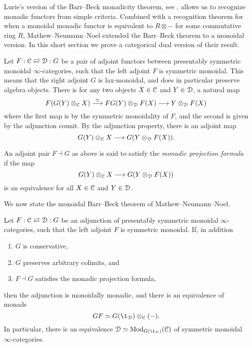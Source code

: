 Lurie's version of the Barr--Beck monadicity theorem, see \cite[Section 4.7]{Lurie_HA}, allows us to recognize monadic functors from simple criteria. Combined with a recognition theorem for when a monoidal monadic functor is equivalent to $R\otimes -$ for some commutative ring $R$, Mathew--Neumann--Noel extended the Barr--Beck theorem to a monoidal version. In this short section we prove a categorical dual version of their result. 

Let $F:\EuScript{C}\rightleftarrows \EuScript{D}:G$ be a pair of adjoint functors between presentably symmetric monoidal $\infty$-categories, such that the left adjoint $F$ is symmetric monoidal. This means that the right adjoint $G$ is lax-monoidal, and does in particular preserve algebra objects. There is for any two objects $X\in \EuScript{C}$ and $Y\in \EuScript{D}$, a natural map
\[F(G(Y)\otimes_{\EuScript{C}} X)\overset{\simeq}{\longrightarrow} FG(Y)\otimes_{\EuScript{D}} F(X) \longrightarrow Y\otimes_{\EuScript{D}} F(X)\]
where the first map is by the symmetric monoidality of $F$, and the second is given by the adjunction counit. By the adjunction property, there is an adjoint map 
\[G(Y)\otimes_{\EuScript{C}} X \longrightarrow G(Y\otimes_{\EuScript{D}} F(X)).\]

\begin{definition}
    An adjoint pair $F\dashv G$ as above is said to satisfy the \emph{monadic projection formula} if the map 
    \[G(Y)\otimes_{\EuScript{C}} X \longrightarrow G(Y\otimes_{\EuScript{D}} F(X))\]
    is an equivalence for all $X\in \EuScript{C}$ and $Y\in \EuScript{D}$. 
\end{definition}

We now state the monoidal Barr--Beck theorem of Mathew--Neumann--Noel. 

\begin{theorem}
    \label{ch2:thm:monoidal-BB}
    Let $F:\EuScript{C}\rightleftarrows \EuScript{D}:G$ be an adjunction of presentably symmetric monoidal $\infty$-categories, such that the left adjoint $F$ is symmetric monoidal. If, in addition
    \begin{enumerate}
        \item $G$ is conservative,
        \item $G$ preserves arbitrary colimits, and
        \item $F\dashv G$ satisfies the monadic projection formula,
    \end{enumerate}
    then the adjunction is monoidally monadic, and there is an equivalence of monads 
    \[GF \simeq G(\1_\D)\otimes_\C(-).\]
    In particular, there is an equivalence $\D\simeq \Mod_{G(\1_\D)}(\C)$ of symmetric monoidal $\infty$-categories. 
\end{theorem}

